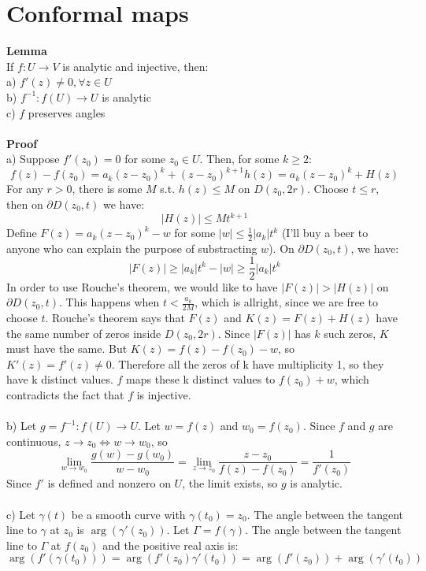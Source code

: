 \documentclass[12 pt]{article}
\begin{document}
\section{Conformal maps}
\textbf{Lemma}
\\
If $f:U\to V$ is analytic and injective, then:
\\
a) $f'(z) \neq 0, \forall z\in U$
\\
b) $f^{-1}:f(U)\to U$ is analytic
\\
c) $f$ preserves angles
\\
\\
\textbf{Proof}
\\
a) Suppose $f'(z_0)=0$ for some $z_0\in U$. Then, for some $k\geq 2$:
\[ f(z) - f(z_0) = a_k (z-z_0)^k + (z-z_0)^{k+1} h(z) =  a_k (z-z_0)^k + H(z) \]
For any $r>0$, there is some $M$ s.t. $h(z)\leq M$ on $D(z_0,2r)$. Choose $t\leq r$, then on $\partial D(z_0,t)$ we have:
\[ |H(z)|\leq M t^{k+1} \]
Define $F(z) = a_k (z-z_0)^k - w$ for some $|w|\leq \frac{1}{2}|a_k|t^k$ (I'll buy a beer to anyone who can explain the purpose of substracting $w$). On $\partial D(z_0,t)$, we have:
\[ |F(z)|\geq |a_k|t^k-|w| \geq \frac{1}{2}|a_k|t^k \]
In order to use Rouche's theorem, we would like to have $|F(z)|>|H(z)|$ on $\partial D(z_0,t)$. This happens when $t<\frac{a_k}{2M}$, which is allright, since we are free to choose $t$. Rouche's theorem says that $F(z)$ and $K(z) = F(z) + H(z)$ have the same number of zeros inside $D(z_0,2r)$. Since $|F(z)|$ has $k$ such zeros, $K$ must have the same. But $K(z) = f(z) - f(z_0) - w$, so $K'(z) = f'(z) \neq 0$. Therefore all the zeros of k have multiplicity 1, so they have k distinct values. $f$ maps these k distinct values to $f(z_0)+w$, which contradicts the fact that $f$ is injective.
\\
\\
b) Let $g=f^{-1}:f(U)\to U$. Let $w=f(z)$ and $w_0=f(z_0)$. Since $f$ and $g$ are continuous, $z\to z_0 \Leftrightarrow w\to w_0$, so
\[ \lim_{w\to w_0} \frac{g(w)-g(w_0)}{w-w_0} = \lim_{z\to z_0} \frac{z-z_0}{f(z)-f(z_0)} = \frac{1}{f'(z_0)} \]
Since $f'$ is defined and nonzero on $U$, the limit exists, so $g$ is analytic.
\\
\\
c) Let $\gamma(t)$ be a smooth curve with $\gamma(t_0) = z_0$. The angle between the tangent line to $\gamma$ at $z_0$ is $\arg(\gamma'(z_0))$. Let $\Gamma = f(\gamma)$. The angle between the tangent line to $\Gamma$ at $f(z_0)$ and the positive real axis is:
\[ \arg\left( f'(\gamma(t_0)) \right) = \arg(f'(z_0) \gamma'(t_0)) = \arg(f'(z_0)) + \arg(\gamma'(t_0))  \]
\end{document}
